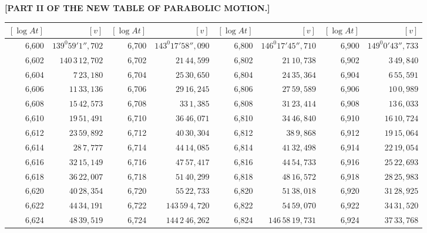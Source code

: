 \clearpage
{}
\begingroup
\centering
\fontsize{9}{9}\selectfont
\setlength{\tabcolsep}{.75pt}
\renewcommand{\arraystretch}{.9}
\setlength{\parskip}{0pt}
\textbf{[PART II OF THE NEW TABLE OF PARABOLIC MOTION.]}
\par\vspace{7pt}
\begin{tabular}{|r|r||r|r||r|r||r|r|}
\hline
\([\log At]\) & \([v]\) & \([\log At]\) & \([v]\) & \([\log At]\) & \([v]\) & \([\log At]\) & \([v]\) \\
\hline
6,600 & \(139^{0}59'1'',\!702\) & 6,700 & \(143^{0}17'58'',\!090\) & 6,800 & \(146^{0}17'45'',\!710\) & 6,900 & \(149^{0}0'43'',\!733\) \\[1pt]
6,602 & \(140\,3\,12,\!702\) & 6,702 & \(21\,44,\!599\) & 6,802 & \(21\,10,\!738\) & 6,902 & \(3\,49,\!840\) \\
6,604 & \(7\,23,\!180\) & 6,704 & \(25\,30,\!650\) & 6,804 & \(24\,35,\!364\) & 6,904 & \(6\,55,\!591\) \\
6,606 & \(11\,33,\!136\) & 6,706 & \(29\,16,\!245\) & 6,806 & \(27\,59,\!589\) & 6,906 & \(10\,0,\!989\) \\
6,608 & \(15\,42,\!573\) & 6,708 & \(33\,1,\!385\) & 6,808 & \(31\,23,\!414\) & 6,908 & \(13\,6,\!033\) \\
6,610 & \(19\,51,\!491\) & 6,710 & \(36\,46,\!071\) & 6,810 & \(34\,46,\!840\) & 6,910 & \(16\,10,\!724\) \\[1pt]
6,612 & \(23\,59,\!892\) & 6,712 & \(40\,30,\!304\) & 6,812 & \(38\,9,\!868\) & 6,912 & \(19\,15,\!064\) \\
6,614 & \(28\,7,\!777\) & 6,714 & \(44\,14,\!085\) & 6,814 & \(41\,32,\!498\) & 6,914 & \(22\,19,\!054\) \\
6,616 & \(32\,15,\!149\) & 6,716 & \(47\,57,\!417\) & 6,816 & \(44\,54,\!733\) & 6,916 & \(25\,22,\!693\) \\
6,618 & \(36\,22,\!007\) & 6,718 & \(51\,40,\!299\) & 6,818 & \(48\,16,\!572\) & 6,918 & \(28\,25,\!983\) \\
6,620 & \(40\,28,\!354\) & 6,720 & \(55\,22,\!733\) & 6,820 & \(51\,38,\!018\) & 6,920 & \(31\,28,\!925\) \\[1pt]
6,622 & \(44\,34,\!191\) & 6,722 & \(143\,59\,4,\!720\) & 6,822 & \(54\,59,\!070\) & 6,922 & \(34\,31,\!520\) \\
6,624 & \(48\,39,\!519\) & 6,724 & \(144\,2\,46,\!262\) & 6,824 & \(146\,58\,19,\!731\) & 6,924 & \(37\,33,\!768\) \\

\end{tabular}
